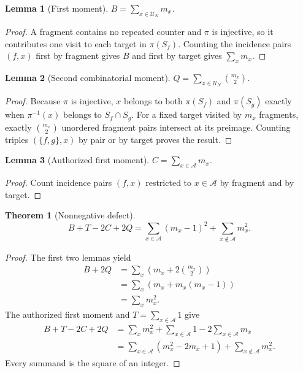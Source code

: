 \documentclass[11pt,onecolumn]{IEEEtran}
\newtheorem{theorem}{Theorem}
\newtheorem{lemma}{Lemma}
\newcommand{\U}{\mathcal U}
\newcommand{\A}{\mathcal A}
\begin{document}
\begin{lemma}[First moment]
$B=\sum_{x\in\U_N}m_x$.
\end{lemma}
\begin{proof}
A fragment contains no repeated counter and $\pi$ is injective, so it contributes one visit to each target in $\pi(S_f)$.  Counting the incidence pairs $(f,x)$ first by fragment gives $B$ and first by target gives $\sum_xm_x$.
\end{proof}

\begin{lemma}[Second combinatorial moment]
$Q=\sum_{x\in\U_N}{m_x\choose2}$.
\end{lemma}
\begin{proof}
Because $\pi$ is injective, $x$ belongs to both $\pi(S_f)$ and $\pi(S_g)$ exactly when $\pi^{-1}(x)$ belongs to $S_f\cap S_g$.  For a fixed target visited by $m_x$ fragments, exactly ${m_x\choose2}$ unordered fragment pairs intersect at its preimage.  Counting triples $(\{f,g\},x)$ by pair or by target proves the result.
\end{proof}

\begin{lemma}[Authorized first moment]
$C=\sum_{x\in\A}m_x$.
\end{lemma}
\begin{proof}
Count incidence pairs $(f,x)$ restricted to $x\in\A$ by fragment and by target.
\end{proof}

\begin{theorem}[Nonnegative defect]
\begin{equation}
B+T-2C+2Q
=\sum_{x\in\A}(m_x-1)^2+
 \sum_{x\notin\A}m_x^2.
\end{equation}
\end{theorem}
\begin{proof}
The first two lemmas yield
\begin{align}
 B+2Q
 &=\sum_x\left(m_x+2{m_x\choose2}\right)\\
 &=\sum_x\left(m_x+m_x(m_x-1)\right)\\
 &=\sum_xm_x^2.
\end{align}
The authorized first moment and $T=\sum_{x\in\A}1$ give
\begin{align}
B+T-2C+2Q
&=\sum_xm_x^2+\sum_{x\in\A}1-2\sum_{x\in\A}m_x\\
&=\sum_{x\in\A}(m_x^2-2m_x+1)+\sum_{x\notin\A}m_x^2.
\end{align}
Every summand is the square of an integer.
\end{proof}
\end{document}
